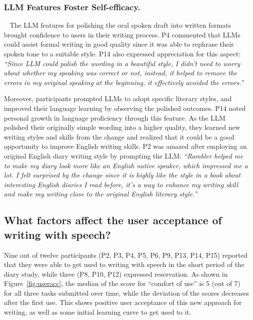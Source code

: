 \vspace{2mm}
\subsubsection{LLM Features Foster Self-efficacy.}~\label{efficacy}
The LLM features for polishing the oral spoken draft into written formats brought confidence to users in their writing process. P4 commented that LLMs could assist formal writing in good quality since it was able to rephrase their spoken tone to a suitable style.
P14 also expressed appreciation for this aspect: \textit{``Since LLM could polish the wording in a beautiful style, I didn't need to worry about whether my speaking was correct or not, instead, it helped to remove the errors in my original speaking at the beginning, it effectively avoided the errors.''}

Moreover,
participants prompted LLMs to adopt specific literary styles, and improved their language learning by observing the polished outcomes. 
P14 noted personal growth in language proficiency through this feature. As the LLM polished their originally simple wording into a higher quality, they learned new writing styles and skills from the change and realized that it could be a good opportunity to improve English writing skills.
P2 was amazed after employing an original English diary writing style by prompting the LLM:
\textit{``Rambler helped me to make my diary look more like an English native speaker, which impressed me a lot. I felt surprised by the change since it is highly like the style in a book about interesting English diaries I read before, it's a way to enhance my writing skill and make my writing close to the original English literary style.''}

\subsection{What factors affect the user acceptance of writing with speech?}
Nine out of twelve participants (P2, P3, P4, P5, P6, P9, P13, P14, P15) reported that they were able to get used to writing with speech in the short period of the diary study, while three (P8, P10, P12) expressed reservation. As shown in Figure~\ref{fig:useracc}, the median of the score for ``comfort of use'' is 5 (out of 7) for all three tasks submitted over time, while the deviation of the scores decreases after the first use. This shows positive user acceptance of this new approach for writing, as well as some initial learning curve to get used to it.

